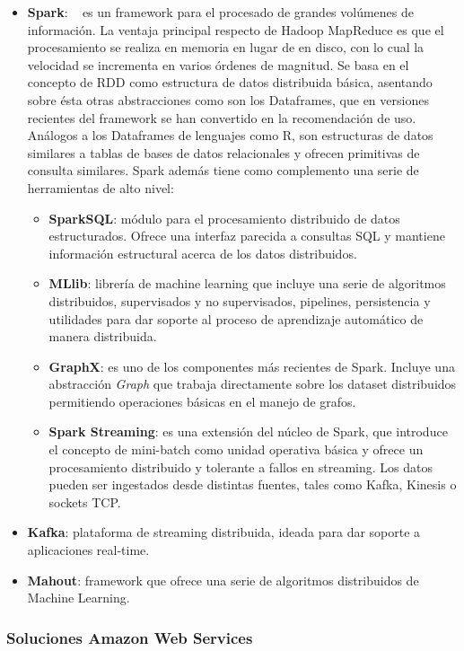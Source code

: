 \begin{itemize}
\item \textbf{Spark}: ~\cite{SPARK} es un framework para el procesado de grandes volúmenes de
  información. La ventaja principal respecto de Hadoop MapReduce es que el
  procesamiento se realiza en memoria en lugar de en disco, con lo cual la
  velocidad se incrementa en varios órdenes de magnitud. Se basa en el concepto
  de \acf{RDD} como estructura de datos distribuida básica, asentando sobre ésta
  otras abstracciones como son los Dataframes, que en versiones recientes del
  framework se han convertido en la recomendación de uso. Análogos a los
  Dataframes de lenguajes como R, son estructuras de datos similares a tablas de
  bases de datos relacionales y ofrecen primitivas de consulta similares. Spark
  además tiene como complemento una serie de
  herramientas de alto nivel:
  \begin{itemize}
  \item \textbf{SparkSQL}: módulo para el procesamiento distribuido de datos
    estructurados. Ofrece una interfaz parecida a consultas SQL y mantiene
    información estructural acerca de los datos distribuidos. 
  \item \textbf{MLlib}: librería de machine learning que incluye una serie de
    algoritmos distribuidos, supervisados y no supervisados, pipelines,
    persistencia y utilidades para dar soporte al proceso de aprendizaje
    automático de manera distribuida. 
  \item \textbf{GraphX}: es uno de los componentes más recientes de
    Spark. Incluye una abstracción \textit{Graph} que trabaja directamente sobre los
    dataset distribuidos permitiendo operaciones básicas en el manejo de
    grafos.
  \item \textbf{Spark Streaming}: es una extensión del núcleo de Spark, que
    introduce el concepto de mini-batch como unidad operativa básica y ofrece un
    procesamiento distribuido y tolerante a fallos en streaming. Los datos
    pueden ser ingestados desde distintas fuentes, tales como Kafka, Kinesis o
    sockets TCP. 
  \end{itemize}
\item \textbf{Kafka}: plataforma de streaming distribuida, ideada para dar
  soporte a aplicaciones real-time. 
\item \textbf{Mahout}: framework que ofrece una serie de algoritmos distribuidos
  de Machine Learning. 
\end{itemize}

\subsubsection{Soluciones Amazon Web Services}
\label{sec:eco-aws}

